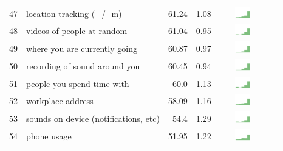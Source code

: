 \begin{table}[t]
\begin{center}
\begin{tabular}{| r | l | r | r | r | r |}
47 & location tracking (+/- m) & 61.24 & 1.08 & \includegraphics[width = 2cm, height = 0.5cm]{tex-inputs/table-images/trackedwhereyouare(likeaGPS)combined} \\ 
48 & videos of people at random & 61.04 & 0.95 &  \includegraphics[width = 2cm, height = 0.5cm]{tex-inputs/table-images/tookvideosofpeople(withanoutward-facingcamera)atrandomcombined} \\ 
49 & where you are currently going & 60.87 & 0.97 &  \includegraphics[width = 2cm, height = 0.5cm]{tex-inputs/table-images/learnedwhereyouarecurrentlygoingcombined} \\ 
50 & recording of sound around you & 60.45 & 0.94 & \includegraphics[width = 2cm, height = 0.5cm]{tex-inputs/table-images/recordedthesoundaroundyoucombined} \\ 
51 & people you spend time with & 60.0 & 1.13 &  \includegraphics[width = 2cm, height = 0.5cm]{tex-inputs/table-images/learnedwhoyouwerespendingtimewithcombined} \\ 
52 & workplace address & 58.09 & 1.16 &\includegraphics[width = 2cm, height = 0.5cm]{tex-inputs/table-images/learnedwhereyouworksomehowcombined} \\ 
53 & sounds on device (notifications, etc) & 54.4 & 1.29 &  \includegraphics[width = 2cm, height = 0.5cm]{tex-inputs/table-images/copiedanduploadedsoundssavedonyourdevice(notificationnoisesetc)combined} \\ 
54 & phone usage & 51.95 &1.22 &  \includegraphics[width = 2cm, height = 0.5cm]{tex-inputs/table-images/learnedhowmuchyouuseyourphonecombined} \\ 

\end{tabular}
\end{center}
\end{table}
